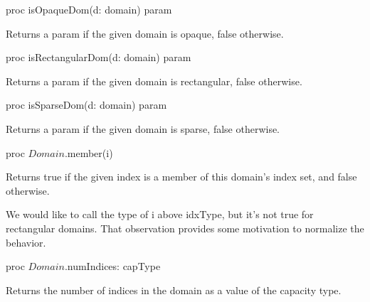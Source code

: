 \begin{protohead}
proc isOpaqueDom(d: domain) param
\end{protohead}
\begin{protobody}
Returns a param  if the given domain is opaque, false otherwise.
\end{protobody}

\begin{protohead}
proc isRectangularDom(d: domain) param
\end{protohead}
\begin{protobody}
Returns a param  if the given domain is rectangular, false otherwise.
\end{protobody}

\begin{protohead}
proc isSparseDom(d: domain) param
\end{protohead}
\begin{protobody}
Returns a param  if the given domain is sparse, false otherwise.
\end{protobody}

\begin{protohead}
proc $Domain$.member(i)
\end{protohead}
\begin{protobody}
Returns true if the given index  is a member of this domain's index set,
and false otherwise.
\end{protobody}

\begin{openissue}
We would like to call the type of i above idxType, but it's not true
for rectangular domains.  That observation provides some motivation to normalize
the behavior.
\end{openissue}

\begin{protohead}
proc $Domain$.numIndices: capType
\end{protohead}
\begin{protobody}
Returns the number of indices in the domain as a value of the capacity type.
\end{protobody}


